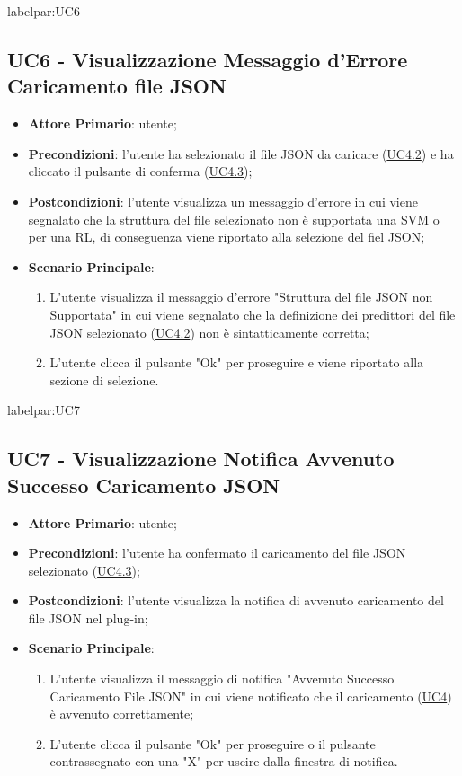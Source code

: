 	
	label{par:UC6}
	\subsection{UC6 - Visualizzazione Messaggio d'Errore Caricamento file JSON }
		\begin{itemize}
			\item\textbf{Attore Primario}: utente;
			\item\textbf{Precondizioni}: l’utente ha selezionato il file JSON da caricare (\hyperref[par:UC4.2]{UC4.2}) e ha cliccato il pulsante di conferma (\hyperref[par:UC4.3]{UC4.3});
			\item\textbf{Postcondizioni}: l’utente visualizza un messaggio d'errore in cui viene segnalato che la struttura del file selezionato non è supportata una SVM o per una RL, di conseguenza viene riportato alla selezione del fiel JSON; 
			\item\textbf{Scenario Principale}: 
				\begin{enumerate} 
					\item L’utente visualizza il messaggio d'errore "Struttura del file JSON non Supportata" in cui viene segnalato che la definizione dei predittori del file JSON selezionato (\hyperref[par:UC4.2]{UC4.2}) non è sintatticamente corretta;
					\item L'utente clicca il pulsante "Ok" per proseguire e viene riportato alla sezione di selezione.
				\end{enumerate}
		\end{itemize}	



	
	label{par:UC7}
	\subsection{UC7 - Visualizzazione Notifica Avvenuto Successo Caricamento JSON}
		\begin{itemize}
			\item\textbf{Attore Primario}: utente;
			\item\textbf{Precondizioni}: l’utente ha confermato il caricamento del file JSON selezionato  (\hyperref[par:UC4.3]{UC4.3});
			\item\textbf{Postcondizioni}: l’utente visualizza la notifica di avvenuto caricamento del file JSON nel plug-in; 
			\item\textbf{Scenario Principale}: 
				\begin{enumerate} 
					\item L’utente visualizza il messaggio di notifica "Avvenuto Successo Caricamento File JSON" in cui viene notificato che il caricamento (\hyperref[par:UC4]{UC4}) è avvenuto correttamente;
					\item L'utente clicca il pulsante "Ok" per proseguire o il pulsante contrassegnato con una "X" per uscire dalla finestra di notifica.		
				\end{enumerate}		
		\end{itemize}

